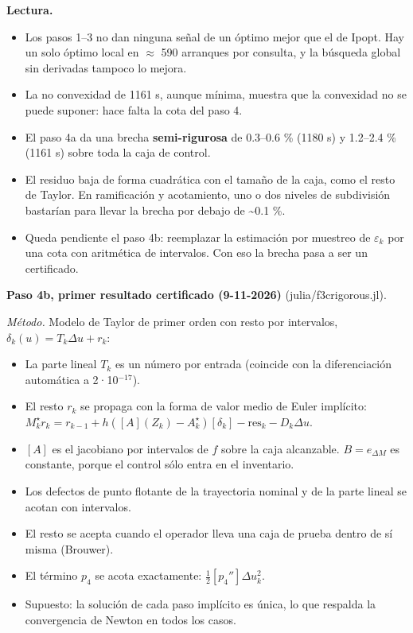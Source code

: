\documentclass[11pt,a4paper]{article}
\newcommand{\codeus}{\textunderscore\allowbreak}
\newcommand{\code}[1]{{\small\ttfamily\let\_\codeus #1}}
\begin{document}
\textbf{Lectura.}

\begin{itemize}
\item Los pasos 1–3 no dan ninguna señal de un óptimo mejor que el de Ipopt. Hay un solo óptimo local en $\approx$ 590 arranques por consulta, y la búsqueda global sin derivadas tampoco lo mejora.
\item La no convexidad de 1161 s, aunque mínima, muestra que la convexidad no se puede suponer: hace falta la cota del paso 4.
\item El paso 4a da una brecha \textbf{semi-rigurosa} de 0.3–0.6 \% (1180 s) y 1.2–2.4 \% (1161 s) sobre toda la caja de control.
\item El residuo baja de forma cuadrática con el tamaño de la caja, como el resto de Taylor. En ramificación y acotamiento, uno o dos niveles de subdivisión bastarían para llevar la brecha por debajo de \textasciitilde{}0.1 \%.
\item Queda pendiente el paso 4b: reemplazar la estimación por muestreo de $\varepsilon_k$ por una cota con aritmética de intervalos. Con eso la brecha pasa a ser un certificado.
\end{itemize}

\textbf{Paso 4b, primer resultado certificado (9-11-2026)} (\code{julia/f3c\_rigorous.jl}).

\emph{Método.} Modelo de Taylor de primer orden con resto por intervalos, $\delta_k(u)=T_k\Delta u+r_k$:

\begin{itemize}
\item La parte lineal $T_k$ es un número por entrada (coincide con la diferenciación automática a 2·10$^{-17}$).
\item El resto $r_k$ se propaga con la forma de valor medio de Euler implícito: $M^\star_k r_k = r_{k-1} + h([A](Z_k)-A^\star_k)[\delta_k] - \text{res}_k - D_k\Delta u$.
\item $[A]$ es el jacobiano por intervalos de $f$ sobre la caja alcanzable. $B=e_{\Delta M}$ es constante, porque el control sólo entra en el inventario.
\item Los defectos de punto flotante de la trayectoria nominal y de la parte lineal se acotan con intervalos.
\item El resto se acepta cuando el operador lleva una caja de prueba dentro de sí misma (Brouwer).
\item El término $p_4$ se acota exactamente: $\tfrac12[p_4'']\Delta u_k^2$.
\item Supuesto: la solución de cada paso implícito es única, lo que respalda la convergencia de Newton en todos los casos.
\end{itemize}
\end{document}
